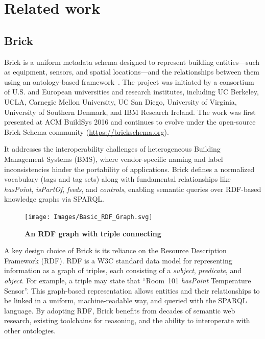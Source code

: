 \chapter{Related work}\label{chap3}

\section{Brick}
Brick is a uniform metadata schema designed to represent building
entities—such as equipment, sensors, and spatial locations—and the
relationships between them using an ontology-based framework~\cite{Balaji2016Brick}.
The project was initiated by a consortium of U.S. and European
universities and research institutes, including UC Berkeley, UCLA,
Carnegie Mellon University, UC San Diego, University of Virginia,
University of Southern Denmark, and IBM Research Ireland.
The work was first presented at ACM BuildSys 2016 and continues
to evolve under the open-source Brick Schema community
(\url{https://brickschema.org}).


It addresses the interoperability challenges of heterogeneous Building
Management Systems (BMS), where vendor-specific naming and label
inconsistencies hinder the portability of applications. Brick defines a
normalized vocabulary (tags and tag sets) along with fundamental
relationships like \emph{hasPoint}, \emph{isPartOf}, \emph{feeds}, and
\emph{controls}, enabling semantic queries over RDF-based knowledge
graphs via SPARQL.

\begin{figure}[ht!]
    \centering
    \texttt{[image: Images/Basic\_RDF\_Graph.svg]}
    \caption{\textbf{An RDF graph with triple connecting}
    }
    \label{fig:RDF}
\end{figure}

A key design choice of Brick is its reliance on the Resource
Description Framework (RDF). RDF is a W3C standard data model for
representing information as a graph of triples, each consisting of a
\emph{subject}, \emph{predicate}, and \emph{object}. For example, a
triple may state that “Room~101 \emph{hasPoint} Temperature Sensor”.
This graph-based representation allows entities and their relationships
to be linked in a uniform, machine-readable way, and queried with the
SPARQL language. By adopting RDF, Brick benefits from decades of
semantic web research, existing toolchains for reasoning, and the ability
to interoperate with other ontologies.

